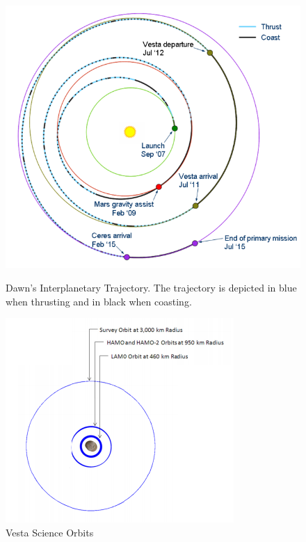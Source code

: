 \begin{figure}[h]
\begin{minipage}[t]{0.45\linewidth}
\centering
\includegraphics[width=\textwidth]{dawninterplanetary.png}
\caption{Dawn's Interplanetary Trajectory. The trajectory is depicted in blue when thrusting and in black when coasting. \cite{dawninter}}
\label{fig:dawninterplanetary}
\end{minipage}
\hspace{0.5cm}
\begin{minipage}[t]{0.45\linewidth}
\centering
\includegraphics[width=\textwidth]{vestaorbits.png}
\caption{Vesta Science Orbits \cite{vestaorbits}}
\label{fig:vestaorbits}
\end{minipage}
\end{figure}

